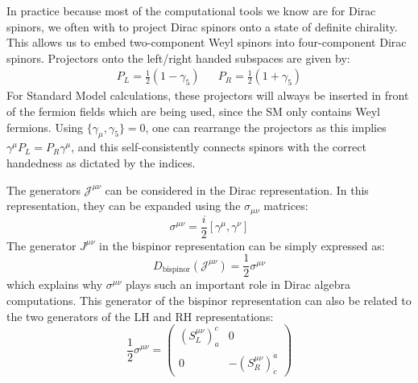 \documentclass[11pt, oneside]{article}   	%
\theoremstyle{definition}
\begin{document}
In practice because most of the computational tools we know are for Dirac spinors, we often with to project Dirac spinors onto a state of 
definite chirality. This allows us to embed two-component Weyl spinors into four-component Dirac spinors. Projectors onto the 
left/right handed subspaces are given by:
\begin{align}
	P_L = \frac{1}{2}(1 - \gamma_5) && P_R = \frac{1}{2}(1 + \gamma_5)
\end{align}
For Standard Model calculations, these projectors will always be inserted in front of the fermion fields which are being used, since the 
SM only contains Weyl fermions. Using $\{\gamma_\mu, \gamma_5\} = 0$, one can rearrange the projectors as this implies 
$\gamma^\mu P_L = P_R\gamma^\mu$, and this self-consistently connects spinors with the correct handedness as dictated by the 
indices. 

The generators $\mathcal J^{\mu\nu}$ can be considered in the Dirac representation. In this representation, they can be 
expanded using the $\sigma_{\mu\nu}$ matrices:
\begin{equation}
	\sigma^{\mu\nu} = \frac{i}{2} [\gamma^\mu, \gamma^\nu]
\end{equation}
The generator $J^{\mu\nu}$ in the bispinor representation can be simply expressed as:
\begin{equation}
	D_\mathrm{bispinor}(\mathcal J^{\mu\nu}) = \frac{1}{2}\sigma^{\mu\nu}
\end{equation}
which explains why $\sigma^{\mu\nu}$ plays such an important role in Dirac algebra computations. This generator of the bispinor 
representation can also be related to the two generators of the LH and RH representations:
\begin{equation}
	\frac{1}{2}\sigma^{\mu\nu} = \begin{pmatrix} (S_L^{\mu\nu})_a^c & 0 \\ 0 & -(S_R^{\mu\nu})^{\dot a}_{\dot c} \end{pmatrix}
\end{equation}
\end{document}
